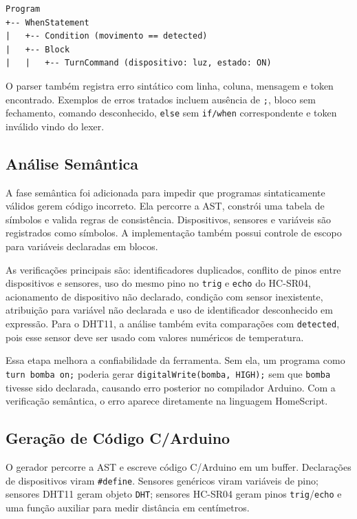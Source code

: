 \documentclass[conference]{IEEEtran}
\begin{document}
\begin{lstlisting}[basicstyle=\ttfamily\scriptsize,frame=single,breaklines=true]
Program
+-- WhenStatement
|   +-- Condition (movimento == detected)
|   +-- Block
|   |   +-- TurnCommand (dispositivo: luz, estado: ON)
\end{lstlisting}

O parser também registra erro sintático com linha, coluna, mensagem e token encontrado. Exemplos de erros tratados incluem ausência de \texttt{;}, bloco sem fechamento, comando desconhecido, \texttt{else} sem \texttt{if/when} correspondente e token inválido vindo do lexer.

\subsection{Análise Semântica}
A fase semântica foi adicionada para impedir que programas sintaticamente válidos gerem código incorreto. Ela percorre a AST, constrói uma tabela de símbolos e valida regras de consistência. Dispositivos, sensores e variáveis são registrados como símbolos. A implementação também possui controle de escopo para variáveis declaradas em blocos.

As verificações principais são: identificadores duplicados, conflito de pinos entre dispositivos e sensores, uso do mesmo pino no \texttt{trig} e \texttt{echo} do HC-SR04, acionamento de dispositivo não declarado, condição com sensor inexistente, atribuição para variável não declarada e uso de identificador desconhecido em expressão. Para o DHT11, a análise também evita comparações com \texttt{detected}, pois esse sensor deve ser usado com valores numéricos de temperatura.

Essa etapa melhora a confiabilidade da ferramenta. Sem ela, um programa como \texttt{turn bomba on;} poderia gerar \texttt{digitalWrite(bomba, HIGH);} sem que \texttt{bomba} tivesse sido declarada, causando erro posterior no compilador Arduino. Com a verificação semântica, o erro aparece diretamente na linguagem HomeScript.

\subsection{Geração de Código C/Arduino}
O gerador percorre a AST e escreve código C/Arduino em um buffer. Declarações de dispositivos viram \texttt{\#define}. Sensores genéricos viram variáveis de pino; sensores DHT11 geram objeto \texttt{DHT}; sensores HC-SR04 geram pinos \texttt{trig}/\texttt{echo} e uma função auxiliar para medir distância em centímetros.
\end{document}
